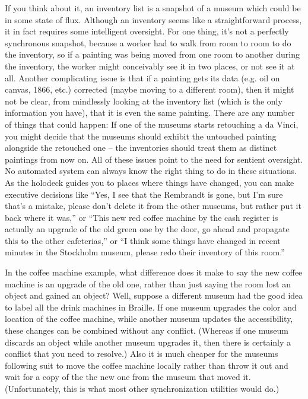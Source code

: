 \documentclass{book}
\begin{document}
If you think about it, an inventory list is a snapshot of a museum which could be in some state of flux.  Although an inventory seems like a straightforward process, it in fact requires some intelligent oversight.  For one thing, it's not a perfectly synchronous snapshot, because a worker had to walk from room to room to do the inventory, so if a painting was being moved from one room to another during the inventory, the worker might conceivably see it in two places, or not see it at all.  Another complicating issue is that if a painting gets its data (e.g. oil on canvas, 1866, etc.) corrected (maybe moving to a different room), then it might not be clear, from mindlessly looking at the inventory list (which is the only information you have), that it is even the same painting.  There are any number of things that could happen:  If one of the museums starts retouching a da Vinci, you might decide that the museums should exhibit the untouched painting alongside the retouched one -- the inventories should treat them as distinct paintings from now on.  All of these issues point to the need for sentient oversight.  No automated system can always know the right thing to do in these situations.  As the holodeck guides you to places where things have changed, you can make executive decisions like ``Yes, I see that the Rembrandt is gone, but I'm sure that's a mistake, please don't delete it from the other museums, but rather put it back where it was,'' or ``This new red coffee machine by the cash register is actually an upgrade of the old green one by the door, go ahead and propagate this to the other cafeterias,'' or ``I think some things have changed in recent minutes in the Stockholm museum, please redo their inventory of this room.''

In the coffee machine example, what difference does it make to say the new coffee machine is an upgrade of the old one, rather than just saying the room lost an object and gained an object?  Well, suppose a different museum had the good idea to label all the drink machines in Braille.  If one museum upgrades the color and location of the coffee machine, while another museum updates the accessibility, these changes can be combined without any conflict.  (Whereas if one museum discards an object while another museum upgrades it, then there is certainly a conflict that you need to resolve.)  Also it is much cheaper for the museums following suit to move the coffee machine locally rather than throw it out and wait for a copy of the the new one from the museum that moved it.  (Unfortunately, this is what most other synchronization utilities would do.)
\end{document}
